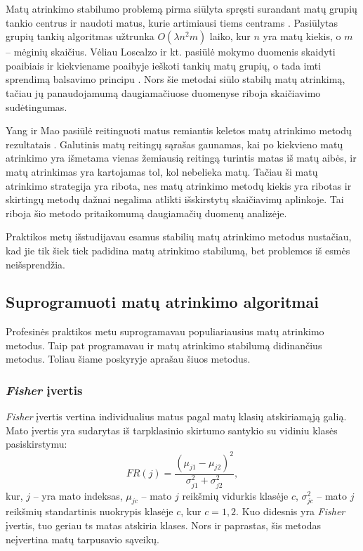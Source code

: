 Matų atrinkimo stabilumo problemą pirma siūlyta spręsti surandant matų grupių tankio centrus ir naudoti matus, kurie artimiausi tiems centrams \cite{yu2008stable}. Pasiūlytas grupių tankių algoritmas užtrunka $O(\lambda n^2m)$ laiko, kur $n$ yra matų kiekis, o $m$ -- mėginių skaičius. Vėliau Loscalzo ir kt. pasiūlė mokymo duomenis skaidyti poaibiais ir kiekviename poaibyje ieškoti tankių matų grupių, o tada imti sprendimą balsavimo principu \cite{loscalzo2009consensus}. Nors šie metodai siūlo stabilų matų atrinkimą, tačiau jų panaudojamumą daugiamačiuose duomenyse riboja skaičiavimo sudėtingumas.

Yang ir Mao pasiūlė reitinguoti matus remiantis keletos matų atrinkimo metodų rezultatais \cite{yang2011robust}. Galutinis matų reitingų sąrašas gaunamas, kai po kiekvieno matų atrinkimo yra išmetama vienas žemiausią reitingą turintis matas iš matų aibės, ir matų atrinkimas yra kartojamas tol, kol nebelieka matų. Tačiau ši matų atrinkimo strategija yra ribota, nes matų atrinkimo metodų kiekis yra ribotas ir skirtingų metodų dažnai negalima atlikti išskirstytų skaičiavimų aplinkoje. Tai riboja šio metodo pritaikomumą daugiamačių duomenų analizėje.

Praktikos metų išstudijavau esamus stabilių matų atrinkimo metodus nustačiau, kad jie tik šiek tiek padidina matų atrinkimo stabilumą, bet problemos iš esmės neišsprendžia.

\subsection{Suprogramuoti matų atrinkimo algoritmai}

Profesinės praktikos metu suprogramavau populiariausius matų atrinkimo metodus. Taip pat programavau ir matų atrinkimo stabilumą didinančius metodus. Toliau šiame poskyryje aprašau šiuos metodus.

\subsubsection{\textit{Fisher} įvertis}

\textit{Fisher} įvertis vertina individualius matus pagal matų klasių atskiriamąją galią. Mato įvertis yra sudarytas iš tarpklasinio skirtumo santykio su vidiniu klasės pasiskirstymu:
\begin{equation}
 FR(j) = \frac{(\mu_{j1} - \mu_{j2})^2}{\sigma_{j1}^2 + \sigma_{j2}^2},
\end{equation}
kur, 
$j$ -- yra mato indeksas, 
$\mu_{jc}$ -- mato $j$ reikšmių vidurkis klasėje $c$, 
$\sigma_{jc}^2$ -- mato $j$ reikšmių standartinis nuokrypis klasėje $c$, kur $c={1,2}$. Kuo didesnis yra \textit{Fisher} įvertis, tuo geriau ts matas atskiria klases. Nors ir paprastas, šis metodas neįvertina matų tarpusavio sąveikų.

